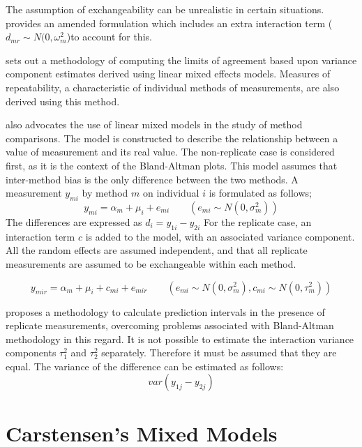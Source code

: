 \documentclass[12pt, a4paper]{report}
\theoremstyle{plain}
\theoremstyle{definition}
\theoremstyle{remark}
\begin{document}
The assumption of exchangeability can
be unrealistic in certain situations. \citet{BXC2004} provides an
amended formulation which includes an extra interaction term ($
d_{mr} \sim N(0,\omega^{2}_{m}$)to account for this.

\citet{BXC2008} sets out a methodology of computing the limits of
agreement based upon variance component estimates derived using
linear mixed effects models. Measures of repeatability, a
characteristic of individual methods of measurements, are also
derived using this method.

\citet{BXC2004} also advocates the use of linear mixed models in
the study of method comparisons. The model is constructed to
describe the relationship between a value of measurement and its
real value. The non-replicate case is considered first, as it is
the context of the Bland-Altman plots. This model assumes that
inter-method bias is the only difference between the two methods.
A measurement $y_{mi}$ by method $m$ on individual $i$ is
formulated as follows;
\begin{equation}
y_{mi}  = \alpha_{m} + \mu_{i} + e_{mi} \qquad ( e_{mi} \sim
N(0,\sigma^{2}_{m}))
\end{equation}
The differences are expressed as $d_{i} = y_{1i} - y_{2i}$ For the
replicate case, an interaction term $c$ is added to the model,
with an associated variance component. All the random effects are
assumed independent, and that all replicate measurements are
assumed to be exchangeable within each method.

\begin{equation}
y_{mir}  = \alpha_{m} + \mu_{i} + c_{mi} + e_{mir} \qquad ( e_{mi}
\sim N(0,\sigma^{2}_{m}), c_{mi} \sim N(0,\tau^{2}_{m}))
\end{equation}

\citet{BXC2008} proposes a methodology to calculate prediction
intervals in the presence of replicate measurements, overcoming
problems associated with Bland-Altman methodology in this regard.
It is not possible to estimate the interaction variance components
$\tau^{2}_{1}$ and $\tau^{2}_{2}$ separately. Therefore it must be
assumed that they are equal. The variance of the difference can be
estimated as follows:
\begin{equation}
var(y_{1j}-y_{2j})
\end{equation}

\newpage
\section{Carstensen's Mixed Models}
\end{document}
